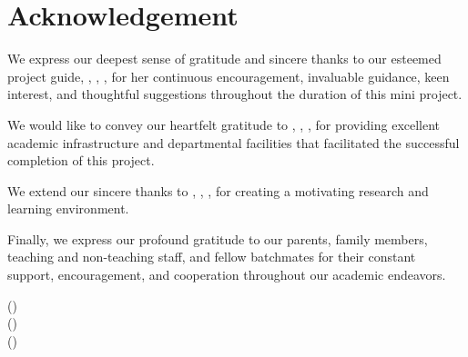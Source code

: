 \chapter*{Acknowledgement}

We express our deepest sense of gratitude and sincere thanks to our esteemed project guide, \textbf{\guidename}, \guideDesignation, \departmentname, for her continuous encouragement, invaluable guidance, keen interest, and thoughtful suggestions throughout the duration of this mini project.

We would like to convey our heartfelt gratitude to \textbf{\hodname}, \hodDesignation, \departmentname, for providing excellent academic infrastructure and departmental facilities that facilitated the successful completion of this project.

We extend our sincere thanks to \textbf{\principalname}, \principalDesignation, \fullinstitutename, for creating a motivating research and learning environment.

Finally, we express our profound gratitude to our parents, family members, teaching and non-teaching staff, and fellow batchmates for their constant support, encouragement, and cooperation throughout our academic endeavors.

\vspace{2.0cm}

\begin{flushright}
\textbf{\studentone} (\studentoneprn)\\
\textbf{\studenttwo} (\studenttwoprn)\\
\textbf{\studentthree} (\studentthreeprn)
\end{flushright}
